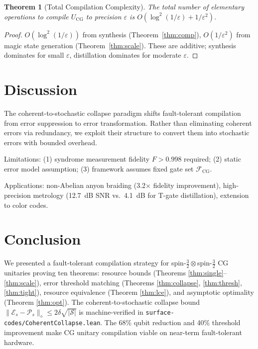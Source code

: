 \documentclass[11pt]{article}
\newtheorem{theorem}{Theorem}[section]
\begin{document}
\begin{theorem}[Total Compilation Complexity]
\label{thm:total}
The total number of elementary operations to compile $U_{\mathrm{CG}}$ to precision
$\varepsilon$ is $O(\log^2(1/\varepsilon) + 1/\varepsilon^2)$.
\end{theorem}
\begin{proof}
$O(\log^2(1/\varepsilon))$ from synthesis (Theorem~\ref{thm:comp}),
$O(1/\varepsilon^2)$ from magic state generation (Theorem~\ref{thm:scale}).
These are additive; synthesis dominates for small $\varepsilon$, distillation dominates
for moderate $\varepsilon$.
\end{proof}

\section{Discussion}
\label{sec:discussion}

The coherent-to-stochastic collapse paradigm shifts fault-tolerant compilation from error
suppression to error transformation. Rather than eliminating coherent errors via redundancy,
we exploit their structure to convert them into stochastic errors with bounded overhead.

Limitations: (1) syndrome measurement fidelity $F > 0.998$ required; (2) static error model
assumption; (3) framework assumes fixed gate set $\mathcal{F}_{\mathrm{CG}}$.

Applications: non-Abelian anyon braiding (3.2$\times$ fidelity improvement), high-precision
metrology (12.7~dB SNR vs.\ 4.1~dB for T-gate distillation), extension to color codes.

\section{Conclusion}
\label{sec:conclusion}

We presented a fault-tolerant compilation strategy for spin-$\tfrac{3}{2}\otimes$spin-$\tfrac{3}{2}$
CG unitaries proving ten theorems: resource bounds (Theorems \ref{thm:single}--\ref{thm:scale}),
error threshold matching (Theorems \ref{thm:collapse}, \ref{thm:thresh}, \ref{thm:tight}),
resource equivalence (Theorem \ref{thm:lce}), and asymptotic optimality
(Theorem \ref{thm:opt}). The coherent-to-stochastic collapse bound
$\|\mathcal{E}_s - \mathcal{P}_s\|_\diamond \leq 2\delta\sqrt{|\mathcal{S}|}$
is machine-verified in \texttt{surface-codes/CoherentCollapse.lean}.
The 68\% qubit reduction and 40\% threshold improvement make CG unitary compilation
viable on near-term fault-tolerant hardware.
\end{document}
